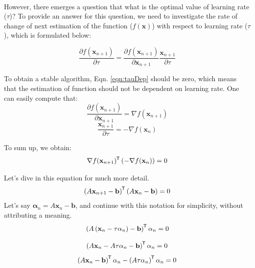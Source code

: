\documentclass[letterpaper,12pt]{article}
\newcommand*{\tran}{^{\mkern-1.5mu\mathsf{T}}}
\begin{document}
\paragraph{} However, there emerges a question that what is the optimal value of learning rate ($\tau$)? To provide an answer for this question, we need to investigate the rate of change of next estimation of the function ($f(\mathbf{x})$) with respect to learning rate ($\tau$), which is formulated below:

\begin{equation}
   \label{eqn:tauDep}
\frac{\partial f(\mathbf{x}_{n+1})}{\partial \tau} = \frac{\partial f(\mathbf{x}_{n+1})}{\partial \mathbf{x}_{n+1}} \frac{\mathbf{x}_{n+1}}{\partial \tau}
\end{equation}

To obtain a stable algorithm, Eqn. \ref{eqn:tauDep} should be zero, which means that the estimation of function should not be dependent on learning rate. One can easily compute that:
\begin{equation*}
   \frac{\partial f(\mathbf{x}_{n+1})}{\partial \mathbf{x}_{n+1}} =  \nabla f(\mathbf{x}_{n+1})
\end{equation*} 
\begin{equation*}
   \frac{\mathbf{x}_{n+1}}{\partial \tau} = - \nabla f(\mathbf{x}_n)
\end{equation*}

To sum up, we obtain:
\begin{equation*}
   \nabla f(\mathbf{x}_{n+1}) \tran \left( - \nabla f(\mathbf{x}_n) \right) = 0
\end{equation*}

Let's dive in this equation for much more detail.
\begin{equation*}
   \left( A\mathbf{x}_{n+1} - \mathbf{b} \right) \tran \left( A\mathbf{x}_{n} - \mathbf{b} \right) = 0
\end{equation*}
Let's say $\mathbf{\alpha}_n = A\mathbf{x}_{n} - \mathbf{b}$, and continue with this notation for simplicity, without attributing a meaning.
\begin{equation*}
\left( A \left( \mathbf{x}_n - \tau \mathbf{\alpha}_n \right) - \mathbf{b} \right) \tran \mathbf{\alpha}_n = 0
\end{equation*}

\begin{equation*}
   \left( A\mathbf{x}_n - A \tau \mathbf{\alpha}_n - \mathbf{b} \right) \tran \mathbf{\alpha}_n = 0
\end{equation*}
\begin{equation*}
   \left( A \mathbf{x}_n - \mathbf{b} \right) \tran \mathbf{\alpha}_n - \left( A \tau \mathbf{\alpha}_n \right)\tran \mathbf{\alpha}_n = 0
\end{equation*}
\end{document}
